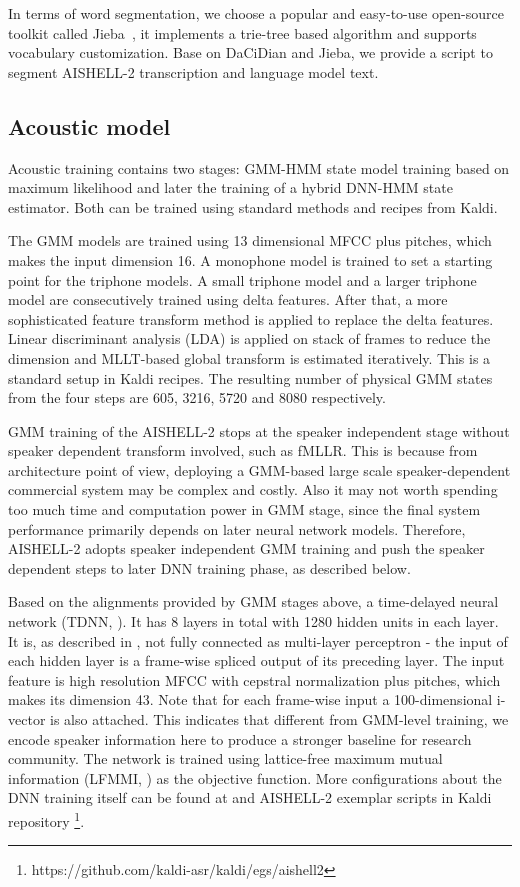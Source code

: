 \documentclass[a4paper]{article}
\begin{document}
In terms of word segmentation, we choose a popular and easy-to-use open-source
toolkit called Jieba~\cite{jieba}, it implements a trie-tree based algorithm and
supports vocabulary customization.  Base on DaCiDian and Jieba, we provide a
script to segment AISHELL-2 transcription and language model text.

\subsection{Acoustic model}

Acoustic training contains two stages: GMM-HMM state model training based on maximum likelihood and later the training of a hybrid DNN-HMM state estimator. Both can be trained using standard methods and recipes from Kaldi.

The GMM models are trained using 13 dimensional MFCC plus pitches, which makes the input dimension 16.
A monophone model is trained to set a starting point for the triphone models. A small triphone model and a larger triphone model are consecutively trained using delta features. After that, a more sophisticated feature transform method is applied to replace the delta features. Linear discriminant analysis (LDA) is applied on stack of frames to reduce the dimension and MLLT-based global transform is estimated iteratively. This is a standard setup in Kaldi recipes. The resulting number of physical GMM states from the four steps are 605, 3216, 5720 and 8080 respectively.

GMM training of the AISHELL-2 stops at the speaker independent stage without speaker dependent transform involved, such as fMLLR. This is because from architecture point of view, deploying a GMM-based large scale speaker-dependent commercial system may be complex and costly. Also it may not worth spending too much time and computation power in GMM stage, since the final system  performance primarily depends on later neural network models. Therefore, AISHELL-2 adopts speaker independent GMM training and push the speaker dependent steps to later DNN training phase, as described below.

Based on the alignments provided by GMM stages above, a time-delayed neural network (TDNN, \cite{tdnn}). It has 8 layers in total with 1280 hidden units in each layer. It is, as described in \cite{tdnn}, not fully connected as multi-layer perceptron - the input of each hidden layer is a frame-wise spliced output of its preceding layer. The input feature is high resolution MFCC with cepstral normalization plus pitches, which makes its dimension 43. Note that for each frame-wise input a 100-dimensional i-vector is also attached. This indicates that different from GMM-level training, we encode speaker information here to produce a stronger baseline for research community. The network is trained using lattice-free maximum mutual information (LFMMI, \cite{lfmmi}) as the objective function. More configurations about the DNN training itself can be found at \cite{lfmmi} and AISHELL-2 exemplar scripts in Kaldi repository \footnote{https://github.com/kaldi-asr/kaldi/egs/aishell2}.
\end{document}
